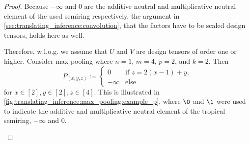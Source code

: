 \begin{proof}
    Because $-\infty$ and $0$ are the additive neutral and multiplicative neutral element of the used semiring respectively,
    the argument in \cref{sec:translating_inference:convolution}, that the factors have to be scaled design tensors, holds here as well.

    Therefore, w.l.o.g. we assume that $U$ and $V$ are design tensors of order one or higher.
    Consider max-pooling where $n = 1$, $m = 4$, $p = 2$, and $k = 2$.
    Then
    $$P_{(x,y,z)} := \begin{cases}
            0       & \text{if $z = 2 (x - 1) + y$}, \\
            -\infty & \text{else}
        \end{cases}$$
    for $x \in [2], y \in [2], z \in [4]$.
    This is illustrated in \cref{fig:translating_inference:max_pooling:example_p}, where $\0$ and $\1$ were used to indicate the additive and multiplicative neutral element of the tropical semiring, $-\infty$ and $0$.
    \begin{figure}[h]
        \centering
\end{figure}
\end{proof}
